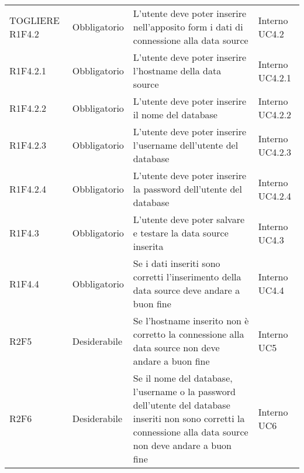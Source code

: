 \begin{longtable} {
		>{}p{24mm} 
		>{}p{32mm}
		>{}p{40mm} 
		>{}p{24.5mm}
		}
	TOGLIERE
        R1F4.2 & Obbligatorio & L'utente deve poter inserire nell'apposito form i dati di connessione alla data source & Interno UC4.2 \TBstrut \\ [2mm]
		R1F4.2.1 & Obbligatorio & L'utente deve poter inserire l'hostname della data source & Interno UC4.2.1 \TBstrut \\ [2mm]
		R1F4.2.2 & Obbligatorio & L'utente deve poter inserire il nome del database & Interno UC4.2.2 \TBstrut \\ [2mm]
        R1F4.2.3 & Obbligatorio & L'utente deve poter inserire l'username dell'utente del database & Interno UC4.2.3 \TBstrut \\ [2mm]
        R1F4.2.4 & Obbligatorio & L'utente deve poter inserire la password dell'utente del database & Interno UC4.2.4 \TBstrut \\ [2mm]
		R1F4.3 & Obbligatorio & L'utente deve poter salvare e testare la data source inserita & Interno UC4.3 \TBstrut \\ [2mm]
		R1F4.4 & Obbligatorio & Se i dati inseriti sono corretti l'inserimento della data source deve andare a buon fine & Interno UC4.4 \TBstrut \\ [2mm]
        R2F5 & Desiderabile & Se l'hostname inserito non è corretto la connessione alla data source non deve andare a buon fine & Interno UC5 \TBstrut \\ [2mm]
		R2F6 & Desiderabile & Se il nome del database, l'username o la password dell'utente del database inseriti non sono corretti la connessione alla data source non deve andare a buon fine & Interno UC6 \TBstrut \\ [2mm]
	\end{longtable}